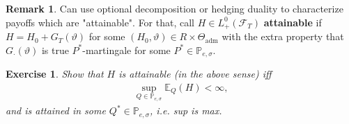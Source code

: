 \documentclass[12pt,a4paper, twoside]{article}
\newtheorem{exe}{Exercise}[section]
\theoremstyle{definition}
\newtheorem{rem}{Remark}[section]
\newcommand{\EE}{\mathbb{E}} %
\newcommand{\PP}{\mathbb{P}} %
\begin{document}
\newpage
\begin{rem} Can use optional decomposition or hedging duality to characterize payoffs which are "attainable". For that, call $H \in L_+^0( \mathcal{F}_T)$ \textbf{attainable} if $H= H_0 + G_T( \vartheta)$ for some $(H_0 , \vartheta) \in R \times \Theta_\text{adm}$ with the extra property that $G_\cdot ( \vartheta)$ is true $P^*$-martingale for some $P^* \in \PP_{e, \sigma}$. 
\end{rem}
\begin{exe} Show that $H$ is attainable (in the above sense) iff 
\begin{align*}
\sup_{Q \in \PP_{e, \sigma}} \EE_Q(H) < \infty,
\end{align*}
and is attained in some $Q^* \in \PP_{e , \sigma}$, i.e. sup is max. 
\end{exe}
\newpage
\end{document}
